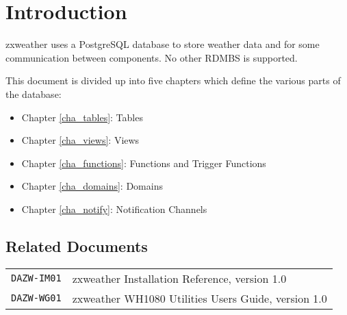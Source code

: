 \documentclass[a4paper,10pt]{book}
\newcommand{\partnumber}{\ifthenelse{\isundefined{\projectnum}}{}{\projectnum-\docnum	\ifthenelse{\equal{\docrev}{001}}{}{.\docrev}}}
\begin{document}

\ifthenelse{\isundefined{\ordernumber}}{

\title{\doctitle{} - \docsubtitle}
\author{\docauthor}
}{

\title{\doctitle}
\subtitle{\docsubtitle}
\titleabstract{\docabstract}
\ordernumber{\partnumber}
\updateinfo{\docupdateinfo}
\osinfo{\docosver}
\swversion{\docswver}
\titlecopyright{\doccopyright}
\licensestatement{\doclicense}
}
\date{\docdate}

\maketitle

\clearpage

\tableofcontents
\clearpage


\chapter{Introduction}
\setcounter{page}{1}

zxweather uses a PostgreSQL database to store weather data and for some communication between components. No other RDMBS is supported.

This document is divided up into five chapters which define the various parts of the database:
\begin{itemize}
\item Chapter \ref{cha_tables}: Tables
\item Chapter \ref{cha_views}: Views
\item Chapter \ref{cha_functions}: Functions and Trigger Functions
\item Chapter \ref{cha_domains}: Domains
\item Chapter \ref{cha_notify}: Notification Channels
\end{itemize}

\section{Related Documents}
\begin{tabular}{l l}
\verb|DAZW-IM01| & zxweather Installation Reference, version 1.0 \\
\verb|DAZW-WG01| & zxweather WH1080 Utilities Users Guide, version 1.0 \\
\end{tabular}
\end{document}

